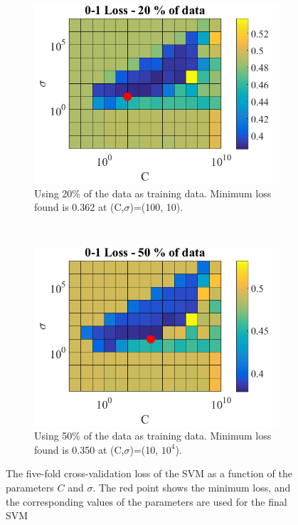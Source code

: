 \documentclass[a4paper,11pt]{article}
\begin{document}
\begin{figure}[h]
    \centering
    \begin{subfigure}[b]{0.45\textwidth}
        \includegraphics[width=\textwidth]{Pix/SVM_02_fixd.png}
		\caption{Using 20\% of the data as training data. Minimum loss found is 0.362 at (C,$\sigma$)=(100, 10).}
		\label{fig:SVM_02}
    \end{subfigure}
    ~
    \begin{subfigure}[b]{0.45\textwidth}
        \includegraphics[width=\textwidth]{Pix/SVM_05_fixd.png}
		\caption{Using 50\% of the data as training data. Minimum loss found is 0.350 at (C,$\sigma$)=(10, $10^4$).}
		\label{fig:SVM_05}
    \end{subfigure}
    \caption{The five-fold cross-validation loss of the SVM as a function of the parameters $C$ and $\sigma$. The red point shows the minimum loss, and the corresponding values of the parameters are used for the final SVM}
	\label{fig:SVM_Train}
\end{figure}
\end{document}

